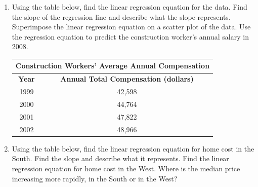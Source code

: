 \documentclass[11pt]{article}
\begin{document}
\begin{enumerate}
        \vspace{5ex}

        \newpage

        \item Using the table below, find the linear regression equation for the data. Find the slope of the regression line and describe what the slope represents. Superimpose the linear regression equation on a scatter plot of the data. Use the regression equation to predict the construction worker's annual salary in 2008.\\[1ex]

        {\renewcommand{\arraystretch}{1.3}
            \begin{tabular}{|c|c|}
                \hline
                \multicolumn{2}{|c|}{\textbf{Construction Workers' Average Annual Compensation}} \\ \hline
                \textbf{Year} & \textbf{Annual Total Compensation (dollars)}                     \\ \hline
                1999          & 42{,}598                                                         \\ \hline
                2000          & 44{,}764                                                         \\ \hline
                2001          & 47{,}822                                                         \\ \hline
                2002          & 48{,}966                                                         \\ \hline
            \end{tabular}}

        \vspace{26ex}

        \item Using the table below, find the linear regression equation for home cost in the South. Find the slope and describe what it represents. Find the linear regression equation for home cost in the West. Where is the median price increasing more rapidly, in the South or in the West?\\[1ex]


\end{enumerate}
\end{document}
